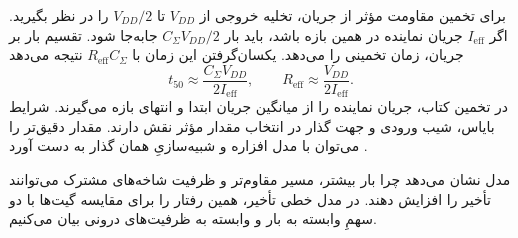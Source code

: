 برای تخمین مقاومت مؤثر از جریان، تخلیه خروجی از \(V_{DD}\) تا
\(V_{DD}/2\) را در نظر بگیرید. اگر \(I_{\mathrm{eff}}\) جریان
نماینده در همین بازه باشد، باید بار
\(C_\Sigma V_{DD}/2\) جابه‌جا شود. تقسیم بار بر جریان، زمان
تخمینی را می‌دهد. یکسان‌گرفتن این زمان با
\(R_{\mathrm{eff}}C_\Sigma\) نتیجه می‌دهد
\begin{equation}
  \label{eq:delay-rc-current-calibration}
  t_{50}\approx\frac{C_\Sigma V_{DD}}{2I_{\mathrm{eff}}},
  \qquad R_{\mathrm{eff}}\approx\frac{V_{DD}}{2I_{\mathrm{eff}}}.
\end{equation}
در تخمین  کتاب، جریان نماینده را از میانگین جریان
ابتدا و انتهای بازه می‌گیرند. شرایط بایاس، شیب ورودی و جهت
گذار در انتخاب مقدار مؤثر نقش دارند. مقدار دقیق‌تر را می‌توان
با مدل افزاره و شبیه‌سازیِ همان گذار به دست آورد
\cite[بخش  و روابط  تا
، صفحات ۱۵۴ و ۱۵۵]{weste}.

مدل  نشان می‌دهد چرا بار بیشتر، مسیر مقاوم‌تر و ظرفیت
شاخه‌های مشترک می‌توانند تأخیر را افزایش دهند. در مدل خطی تأخیر،
همین رفتار را برای مقایسه گیت‌ها با دو سهمِ وابسته به بار و
وابسته به ظرفیت‌های درونی بیان می‌کنیم.
